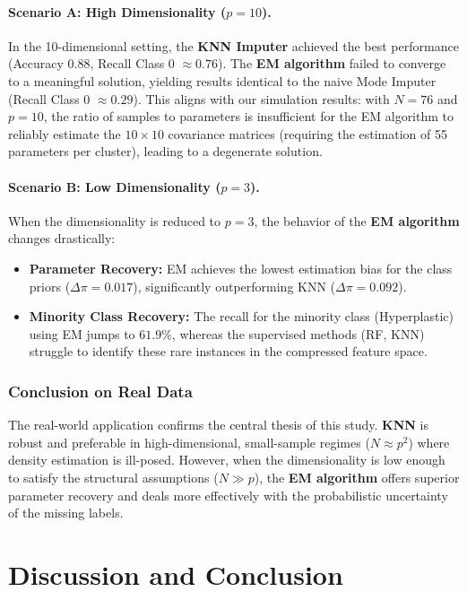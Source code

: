 \documentclass[11pt, a4paper]{article}
\begin{document}
\paragraph{Scenario A: High Dimensionality ($p=10$).}
In the 10-dimensional setting, the \textbf{KNN Imputer} achieved the best performance (Accuracy $0.88$, Recall Class 0 $\approx 0.76$). The \textbf{EM algorithm} failed to converge to a meaningful solution, yielding results identical to the naive Mode Imputer (Recall Class 0 $\approx 0.29$).
This aligns with our simulation results: with $N=76$ and $p=10$, the ratio of samples to parameters is insufficient for the EM algorithm to reliably estimate the $10 \times 10$ covariance matrices (requiring the estimation of 55 parameters per cluster), leading to a degenerate solution.

\paragraph{Scenario B: Low Dimensionality ($p=3$).}
When the dimensionality is reduced to $p=3$, the behavior of the \textbf{EM algorithm} changes drastically:
\begin{itemize}
    \item \textbf{Parameter Recovery:} EM achieves the lowest estimation bias for the class priors ($\Delta \pi = 0.017$), significantly outperforming KNN ($\Delta \pi = 0.092$).
    \item \textbf{Minority Class Recovery:} The recall for the minority class (Hyperplastic) using EM jumps to $61.9\%$, whereas the supervised methods (RF, KNN) struggle to identify these rare instances in the compressed feature space.
\end{itemize}

\subsubsection{Conclusion on Real Data}
The real-world application confirms the central thesis of this study. \textbf{KNN} is robust and preferable in high-dimensional, small-sample regimes ($N \approx p^2$) where density estimation is ill-posed. However, when the dimensionality is low enough to satisfy the structural assumptions ($N \gg p$), the \textbf{EM algorithm} offers superior parameter recovery and deals more effectively with the probabilistic uncertainty of the missing labels.

\section{Discussion and Conclusion}
\end{document}
